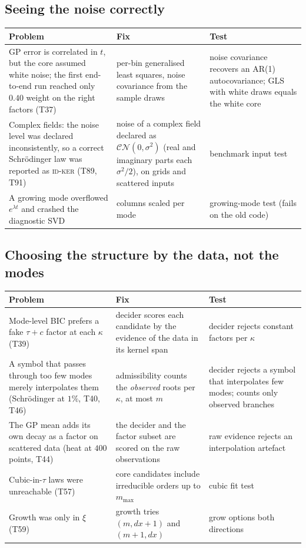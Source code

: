 \subsection{Seeing the noise correctly}
\begin{center}\small
\begin{tabular}{@{}L{4.1cm}L{4.4cm}L{4.4cm}@{}}
\toprule
Problem & Fix & Test\\\midrule
GP error is correlated in $t$, but the core assumed white noise; the first end-to-end run reached only $0.40$ weight on the right factors (T37) & per-bin generalised least squares, noise covariance from the sample draws & noise covariance recovers an AR(1) autocovariance; GLS with white draws equals the white core\\
Complex fields: the noise level was declared inconsistently, so a correct Schr\"odinger law was reported as \textsc{id-ker} (T89, T91) & noise of a complex field declared as $\mathcal{CN}(0,\sigma^2)$ (real and imaginary parts each $\sigma^2/2$), on grids and scattered inputs & benchmark input test\\
A growing mode overflowed $e^{\lambda t}$ and crashed the diagnostic SVD & columns scaled per mode & growing-mode test (fails on the old code)\\
\bottomrule
\end{tabular}
\end{center}

\subsection{Choosing the structure by the data, not the modes}
\begin{center}\small
\begin{tabular}{@{}L{4.1cm}L{4.4cm}L{4.4cm}@{}}
\toprule
Problem & Fix & Test\\\midrule
Mode-level BIC prefers a fake $\tau+c$ factor at each $\kappa$ (T39) & decider scores each candidate by the evidence of the data in its kernel span & decider rejects constant factors per $\kappa$\\
A symbol that passes through too few modes merely interpolates them (Schr\"odinger at $1\%$, T40, T46) & admissibility counts the \emph{observed} roots per $\kappa$, at most $m$ & decider rejects a symbol that interpolates few modes; counts only observed branches\\
The GP mean adds its own decay as a factor on scattered data (heat at $400$ points, T44) & the decider and the factor subset are scored on the raw observations & raw evidence rejects an interpolation artefact\\
Cubic-in-$\tau$ laws were unreachable (T57) & core candidates include irreducible orders up to $m_{\max}$ & cubic fit test\\
Growth was only in $\xi$ (T59) & growth tries $(m,dx+1)$ and $(m+1,dx)$ & grow options both directions\\
\bottomrule
\end{tabular}
\end{center}

